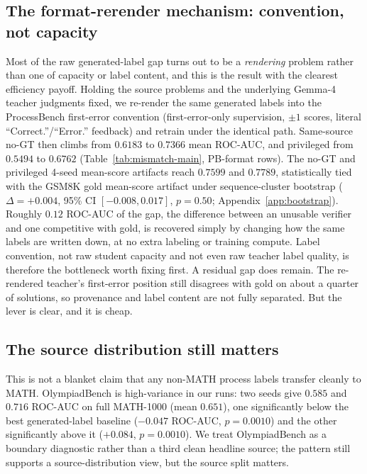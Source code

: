 \documentclass{article}
\begin{document}
\subsection{The format-rerender mechanism: convention, not capacity}
\label{sec:mismatch-rerender}
Most of the raw generated-label gap turns out to be a \emph{rendering}
problem rather than one of capacity or label content, and this is the result
with the clearest efficiency payoff. Holding the source problems and the
underlying Gemma-4 teacher judgments fixed, we re-render the same generated
labels into the ProcessBench first-error convention (first-error-only
supervision, $\pm 1$ scores, literal ``Correct.''/``Error.'' feedback) and
retrain under the identical path. Same-source no-GT then climbs from $0.6183$
to $0.7366$ mean ROC-AUC, and privileged from $0.5494$ to $0.6762$
(Table~\ref{tab:mismatch-main}, PB-format rows). The no-GT and privileged
4-seed mean-score artifacts reach $0.7599$ and $0.7789$, statistically tied
with the GSM8K gold mean-score artifact under sequence-cluster bootstrap
($\Delta=+0.004$, 95\% CI $[-0.008, 0.017]$, $p=0.50$;
Appendix~\ref{app:bootstrap}). Roughly $0.12$ ROC-AUC of the gap, the
difference between an unusable verifier and one competitive with gold, is
recovered simply by changing how the same labels are written down, at no extra
labeling or training compute. Label convention, not raw student capacity and
not even raw teacher label quality, is therefore the bottleneck worth fixing
first. A residual gap does remain. The re-rendered teacher's first-error
position still disagrees with gold on about a quarter of solutions, so
provenance and label content are not fully separated. But the lever is clear,
and it is cheap.

\subsection{The source distribution still matters}
This is not a blanket claim that any non-MATH process labels transfer
cleanly to MATH. OlympiadBench is high-variance in our runs: two seeds give
$0.585$ and $0.716$ ROC-AUC on full MATH-1000 (mean $0.651$), one
significantly below the best generated-label baseline
($-0.047$ ROC-AUC, $p=0.0010$) and the other significantly above it
($+0.084$, $p=0.0010$). We treat OlympiadBench as a boundary diagnostic
rather than a third clean headline source; the pattern still supports a
source-distribution view, but the source split matters.
\end{document}
